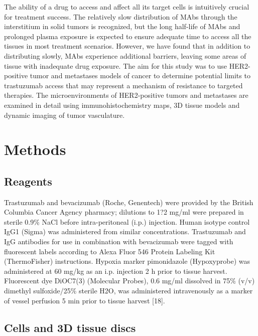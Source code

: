 The ability of a drug to access and affect all its target cells is intuitively crucial for treatment success.
The relatively slow distribution of MAbs through the interstitium in solid tumors is recognized, but the long half-life of MAbs and prolonged plasma exposure is expected to ensure adequate time to access all the tissues in most treatment scenarios.
However, we have found that in addition to distributing slowly, MAbs experience additional barriers, leaving some areas of tissue with inadequate drug exposure.
The aim for this study was to use HER2-positive tumor and metastases models of cancer to determine potential limits to trastuzumab access that may represent a mechanism of resistance to targeted therapies.
The microenvironments of HER2-positive tumors and metastases are examined in detail using immunohistochemistry maps, 3D tissue models and dynamic imaging of tumor vasculature.

\section{Methods}

\subsection{Reagents}

Trastuzumab and bevacizumab (Roche, Genentech) were provided by the British Columbia Cancer Agency pharmacy; dilutions to 1?2 mg/ml were prepared in sterile 0.9\% NaCl before intra-peritoneal (i.p.) injection.
Human isotype control IgG1 (Sigma) was administered from similar concentrations.
Trastuzumab and IgG antibodies for use in combination with bevacizumab were tagged with fluorescent labels according to Alexa Fluor 546 Protein Labeling Kit (ThermoFisher) instructions.
Hypoxia marker pimonidazole (Hypoxyprobe) was administered at 60 mg/kg as an i.p.
injection 2 h prior to tissue harvest.
Fluorescent dye DiOC7(3) (Molecular Probes), 0.6 mg/ml dissolved in 75\% (v/v) dimethyl sulfoxide/25\% sterile H2O, was administered intravenously as a marker of vessel perfusion 5 min prior to tissue harvest [18].

\subsection{Cells and 3D tissue discs}

